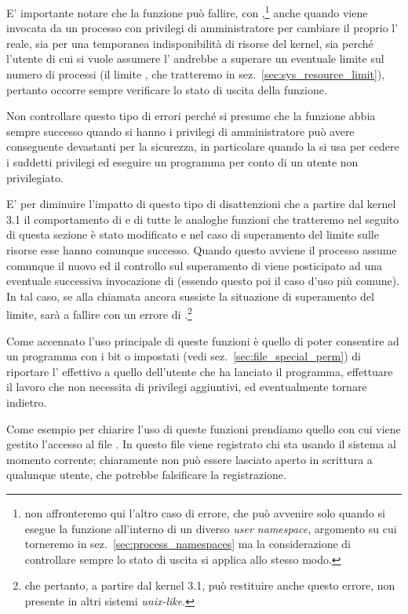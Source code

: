 E' importante notare che la funzione può fallire, con
,\footnote{non affronteremo qui l'altro caso di errore, che può
  avvenire solo quando si esegue la funzione all'interno di un diverso
  \textit{user namespace}, argomento su cui torneremo in
  sez.~\ref{sec:process_namespaces} ma la considerazione di controllare sempre
  lo stato di uscita si applica allo stesso modo.} anche quando viene invocata
da un processo con privilegi di amministratore per cambiare il proprio
l' reale, sia per una temporanea indisponibilità di risorse del
kernel, sia perché l'utente di cui si vuole assumere l' andrebbe a
superare un eventuale limite sul numero di processi (il limite
, che tratteremo in sez.~\ref{sec:sys_resource_limit}),
pertanto occorre sempre verificare lo stato di uscita della funzione.

Non controllare questo tipo di errori perché si presume che la funzione abbia
sempre successo quando si hanno i privilegi di amministratore può avere
conseguente devastanti per la sicurezza, in particolare quando la si usa per
cedere i suddetti privilegi ed eseguire un programma per conto di un utente
non privilegiato.

E' per diminuire l'impatto di questo tipo di disattenzioni che a partire dal
kernel 3.1 il comportamento di  e di tutte le analoghe funzioni
che tratteremo nel seguito di questa sezione è stato modificato e nel caso di
superamento del limite sulle risorse esse hanno comunque successo. Quando
questo avviene il processo assume comunque il nuovo  ed il controllo
sul superamento di  viene posticipato ad una eventuale
successiva invocazione di  (essendo questo poi il caso d'uso più
comune). In tal caso, se alla chiamata ancora sussiste la situazione di
superamento del limite, sarà  a fallire con un errore di
.\footnote{che pertanto, a partire dal kernel 3.1, può
  restituire anche questo errore, non presente in altri sistemi
  \textit{unix-like}.}

Come accennato l'uso principale di queste funzioni è quello di poter
consentire ad un programma con i bit  o  impostati (vedi
sez.~\ref{sec:file_special_perm}) di riportare l' effettivo a quello
dell'utente che ha lanciato il programma, effettuare il lavoro che non
necessita di privilegi aggiuntivi, ed eventualmente tornare indietro.

Come esempio per chiarire l'uso di queste funzioni prendiamo quello con cui
viene gestito l'accesso al file .  In questo file viene
registrato chi sta usando il sistema al momento corrente; chiaramente non può
essere lasciato aperto in scrittura a qualunque utente, che potrebbe
falsificare la registrazione.

